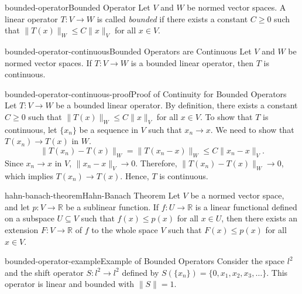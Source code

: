 \documentclass[preview]{standalone}
\begin{document}
\begin{snippetdefinition}{bounded-operator}{Bounded Operator}
    Let \(V\) and \(W\) be normed vector spaces. A linear operator \(T: V \to W\) is called \textit{bounded} if there exists a constant \(C \geq 0\) such that \(\|T(x)\|_W \leq C\|x\|_V\) for all \(x \in V\).
\end{snippetdefinition}

\begin{snippettheorem}{bounded-operator-continuous}{Bounded Operators are Continuous}
    Let \(V\) and \(W\) be normed vector spaces. If \(T: V \to W\) is a bounded linear operator, then \(T\) is continuous.
\end{snippettheorem}

\begin{snippetproof}{bounded-operator-continuous-proof}{Proof of Continuity for Bounded Operators}
    Let \(T: V \to W\) be a bounded linear operator. By definition, there exists a constant \(C \geq 0\) such that \(\|T(x)\|_W \leq C\|x\|_V\) for all \(x \in V\). To show that \(T\) is continuous, let \(\{x_n\}\) be a sequence in \(V\) such that \(x_n \to x\). We need to show that \(T(x_n) \to T(x)\) in \(W\).
    \[
        \|T(x_n) - T(x)\|_W = \|T(x_n - x)\|_W \leq C\|x_n - x\|_V.
    \]
    Since \(x_n \to x\) in \(V\), \(\|x_n - x\|_V \to 0\). Therefore, \(\|T(x_n) - T(x)\|_W \to 0\), which implies \(T(x_n) \to T(x)\). Hence, \(T\) is continuous.
\end{snippetproof}

\begin{snippettheorem}{hahn-banach-theorem}{Hahn-Banach Theorem}
    Let \(V\) be a normed vector space, and let \(p: V \to \mathbb{R}\) be a sublinear function. If \(f: U \to \mathbb{R}\) is a linear functional defined on a subspace \(U \subseteq V\) such that \(f(x) \leq p(x)\) for all \(x \in U\), then there exists an extension \(F: V \to \mathbb{R}\) of \(f\) to the whole space \(V\) such that \(F(x) \leq p(x)\) for all \(x \in V\).
\end{snippettheorem}

\begin{snippetexample}{bounded-operator-example}{Example of Bounded Operators}
    Consider the space \(l^2\) and the shift operator \(S: l^2 \to l^2\) defined by \(S(\{x_n\}) = \{0, x_1, x_2, x_3, \ldots\}\). This operator is linear and bounded with \(\|S\| = 1\).
\end{snippetexample}
\end{document}
